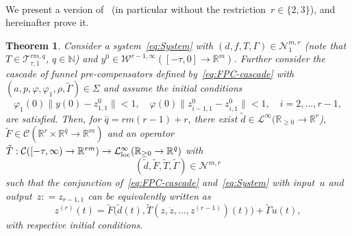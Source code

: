\documentclass[ envcountsect, envcountsame]{svjour3}
\newtheorem{Theorem}{Theorem}[section]
\newcommand{\R}{\mathbb{R}}
\newcommand{\N}{\mathbb{N}}
\newcommand{\cC}{\mathcal{C}}
\newcommand{\cL}{\mathcal{L}}
\newcommand{\cN}{\mathcal{N}}
\newcommand{\cT}{\mathcal{T}}
\newcommand{\cW}{\mathcal{W}}
\newcommand{\vp}{\varphi}
\newcommand{\rp}{\mathbb{R}_{\geq 0}}
\begin{document}
\ \\
We present a version of~\cite[Thm. 2]{BergReis18b} (in particular without the restriction~${r \in \{ 2,3 \}}$), and hereinafter prove it.
%
\begin{Theorem} \label{Thm:FPC-min-phase}
Consider a system~\eqref{eq:System} with 
$(d,f,T,\Gamma) \in  \cN^{m,r}_1$ (note that $T \in \cT^{rm,q}_{\tau,1}$, $q \in \N$) and $y^0 \in \cW^{r-1,\infty}([-\tau,0] \to \R^m)$. 
Further consider the cascade of funnel pre-compensators defined by~\eqref{eq:FPC-cascade} with~$(a,p, \vp,\vp_1,\rho, \tilde \Gamma ) \in \Sigma $
and assume the initial conditions
\begin{equation} \label{eq:inital}
\vp_1(0)\| y(0) - z_{1,1}^0 \| < 1, \quad \vp(0)\| z_{i-1,1}^0 - z_{i,1}^0 \| < 1, \quad i=2,\ldots,r-1,
\end{equation}
are satisfied.
Then, for $\bar q = rm(r-1)+r$, there exist $\tilde d \in \cL^\infty( \rp \to \R^r$), $\tilde F \in \cC( \R^r \times \R^{\bar q} \to \R^m)$ 
and an operator $\tilde T : \cC([-\tau,\infty) \to \R^{rm}) \to \cL_{\rm loc}^\infty(\rp \to \R^{\bar q})$ with
\begin{equation*}
(\tilde d,\tilde F,\tilde T, \tilde \Gamma) \in \cN^{m,r} 
\end{equation*}
such that
the conjunction of~\eqref{eq:FPC-cascade} and~\eqref{eq:System} with input~$u$ and output~$z : = z_{r-1,1}$ can be equivalently written as
\begin{equation} \label{eq:ddt_r-z}
z^{(r)}(t) = \tilde F\big( \tilde d(t), \tilde T(z,\dot z,\ldots,z^{(r-1)})(t) \big) + \tilde \Gamma u(t), %
\end{equation}
with respective initial conditions.
\end{Theorem}
%
\end{document}
